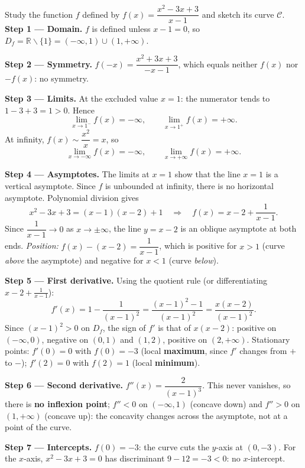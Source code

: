 \documentclass[11pt]{article}
\newcommand{\cle}[1]{{\popxbold\color{popdark}#1}}
\def\setminus{\mathbin{\backslash}}\let\smallsetminus\setminus
\begin{document}
\begin{exoresolu}[Full GCE-Style Study of $f(x)=\dfrac{x^2-3x+3}{x-1}$]
Study the function $f$ defined by $f(x)=\dfrac{x^2-3x+3}{x-1}$ and sketch its curve $\mathcal{C}$.
\tcblower
\textbf{Step 1 — Domain.} $f$ is defined unless $x-1=0$, so $D_f=\mathbb{R}\setminus\{1\}=(-\infty,1)\cup(1,+\infty)$.

\textbf{Step 2 — Symmetry.} $f(-x)=\dfrac{x^2+3x+3}{-x-1}$, which equals neither $f(x)$ nor $-f(x)$: no symmetry.

\textbf{Step 3 — Limits.} At the excluded value $x=1$: the numerator tends to $1-3+3=1>0$. Hence
\[ \lim_{x\to 1^-}f(x)=-\infty, \qquad \lim_{x\to 1^+}f(x)=+\infty. \]
At infinity, $f(x)\sim \dfrac{x^2}{x}=x$, so
\[ \lim_{x\to-\infty}f(x)=-\infty, \qquad \lim_{x\to+\infty}f(x)=+\infty. \]

\textbf{Step 4 — Asymptotes.} The limits at $x=1$ show that the line $x=1$ is a \cle{vertical asymptote}. Since $f$ is unbounded at infinity, there is no horizontal asymptote. Polynomial division gives
\[ x^2-3x+3=(x-1)(x-2)+1 \quad\Longrightarrow\quad f(x)=x-2+\frac{1}{x-1}. \]
Since $\dfrac{1}{x-1}\to 0$ as $x\to\pm\infty$, the line $y=x-2$ is an \cle{oblique asymptote} at both ends. \emph{Position:} $f(x)-(x-2)=\dfrac{1}{x-1}$, which is positive for $x>1$ (curve \emph{above} the asymptote) and negative for $x<1$ (curve \emph{below}).

\textbf{Step 5 — First derivative.} Using the quotient rule (or differentiating $x-2+\frac{1}{x-1}$):
\[ f'(x)=1-\frac{1}{(x-1)^2}=\frac{(x-1)^2-1}{(x-1)^2}=\frac{x(x-2)}{(x-1)^2}. \]
Since $(x-1)^2>0$ on $D_f$, the sign of $f'$ is that of $x(x-2)$: positive on $(-\infty,0)$, negative on $(0,1)$ and $(1,2)$, positive on $(2,+\infty)$. Stationary points: $f'(0)=0$ with $f(0)=-3$ (local \textbf{maximum}, since $f'$ changes from $+$ to $-$); $f'(2)=0$ with $f(2)=1$ (local \textbf{minimum}).

\textbf{Step 6 — Second derivative.} $f''(x)=\dfrac{2}{(x-1)^3}$. This never vanishes, so there is \textbf{no inflexion point}; $f''<0$ on $(-\infty,1)$ (concave down) and $f''>0$ on $(1,+\infty)$ (concave up): the concavity changes across the asymptote, not at a point of the curve.

\textbf{Step 7 — Intercepts.} $f(0)=-3$: the curve cuts the $y$-axis at $(0,-3)$. For the $x$-axis, $x^2-3x+3=0$ has discriminant $9-12=-3<0$: no $x$-intercept.


\end{exoresolu}
\end{document}
